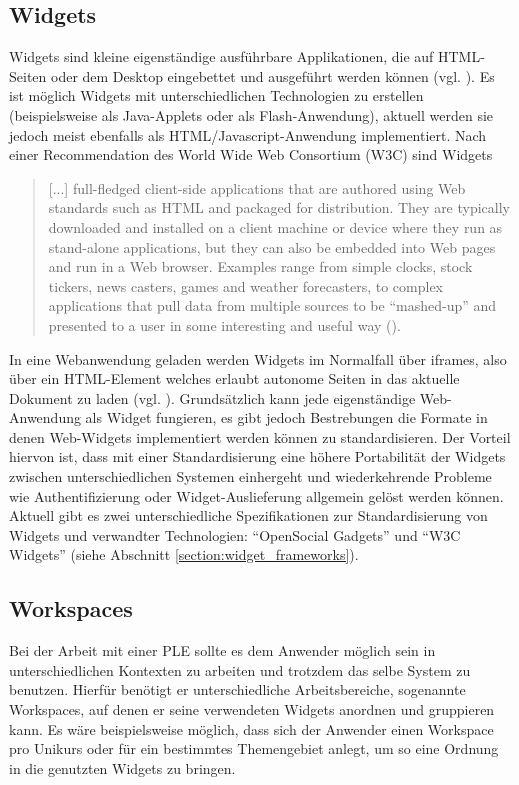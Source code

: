 \subsection{Widgets}\label{section:widgets}
Widgets sind kleine eigenständige ausführbare Applikationen, die auf HTML-Seiten oder dem Desktop eingebettet und ausgeführt werden können (vgl. \cite{Taraghi2010}). Es ist möglich Widgets mit unterschiedlichen Technologien zu erstellen (beispielsweise als Java-Applets oder als Flash-Anwendung), aktuell werden sie jedoch meist ebenfalls als HTML/Javascript-Anwendung implementiert. Nach einer Recommendation des World Wide Web Consortium (W3C) sind Widgets
\begin{quotation}[...] full-fledged client-side applications that are authored using Web standards such as HTML and packaged for distribution. They are typically downloaded and installed on a client machine or device where they run as stand-alone applications, but they can also be embedded into Web pages and run in a Web browser. Examples range from simple clocks, stock tickers, news casters, games and weather forecasters, to complex applications that pull data from multiple sources to be "`mashed-up"' and presented to a user in some interesting and useful way (\cite{W3C-11-2012}).\end{quotation}
In eine Webanwendung geladen werden Widgets im Normalfall über iframes, also über ein HTML-Element welches erlaubt autonome Seiten in das aktuelle Dokument zu laden (vgl. \cite{W3C1999}). Grundsätzlich kann jede eigenständige Web-Anwendung als Widget fungieren, es gibt jedoch Bestrebungen die Formate in denen Web-Widgets implementiert werden können zu standardisieren. Der Vorteil hiervon ist, dass mit einer Standardisierung eine höhere Portabilität der Widgets zwischen unterschiedlichen Systemen einhergeht und wiederkehrende Probleme wie Authentifizierung oder Widget-Auslieferung allgemein gelöst werden können. Aktuell gibt es zwei unterschiedliche Spezifikationen zur Standardisierung von Widgets und verwandter Technologien: "`OpenSocial Gadgets"' und "`W3C Widgets"' (siehe Abschnitt \ref{section:widget_frameworks}).

\subsection{Workspaces}
Bei der Arbeit mit einer PLE sollte es dem Anwender möglich sein in unterschiedlichen Kontexten zu arbeiten und trotzdem das selbe System zu benutzen. Hierfür benötigt er unterschiedliche Arbeitsbereiche, sogenannte Workspaces, auf denen er seine verwendeten Widgets anordnen und gruppieren kann. Es wäre beispielsweise möglich, dass sich der Anwender einen Workspace pro Unikurs oder für ein bestimmtes Themengebiet anlegt, um so eine Ordnung in die genutzten Widgets zu bringen. 